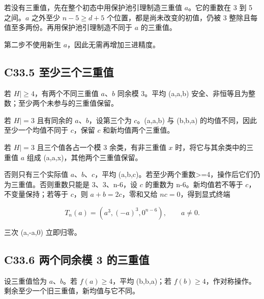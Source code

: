 {若没有三重值，先在整个初态中用保护池引理制造三重值} {\ensuremath{a}。它的重数在} {3} {到} {5} {之间。\ensuremath{a}} {之外至少} {\ensuremath{n-5\ge d+5}} {个位置，都是尚未改变的初值，仍被} {3} {整除且每值至多两份。再用保护池引理制造不同于} {\ensuremath{a}} {的三重值。}

{第二步不使用新生} {\ensuremath{a}，因此无需再增加三进精度。}

\subsection*{\texorpdfstring{{C33.5} {至少三个三重值}}{C33.5 至少三个三重值}}\label{C33-h219}

{若} {\textbar{}\ensuremath{H|\ge 4}，有两个不同三重值} {\ensuremath{a}、\ensuremath{b}} {同余模} {3。平均} {(a,a,b)} {安全、非恒等且为整数；至少两个未参与的三重值保留。}

{若} {\textbar{}\ensuremath{H|=3}} {且有同余的} {\ensuremath{a}、\ensuremath{b}，设第三个为} {\ensuremath{c}。(a,a,b)} {与} {(b,b,a)} {的均值不同，因此至少一个均值不同于} {\ensuremath{c}，保留} {\ensuremath{c}} {和新均值两个三重值。}

{若} {\textbar{}\ensuremath{H|=3}} {且三个值各占一个模} {3} {余类，有非三重值} {\ensuremath{x}} {时，将它与其余类中的三重值} {\ensuremath{a}} {组成} {(a,a,x)，其他两个三重值保留。}

{否则只有三个实际值} {\ensuremath{a}、\ensuremath{b}、\ensuremath{c}，平均} {(a,b,c)。若至少两个重数\textgreater=4，操作后它们仍为三重值。否则重数只能是} {3、3、n-6，设} {\ensuremath{c}} {的重数为} {n-6。新均值若不等于} {\ensuremath{c}，不变量保持；若等于} {\ensuremath{c}，则} {\ensuremath{a+b=2c}，零和又给} {\ensuremath{nc=0}，得到显式终端}

\[
T_n(a)=(a^3,(-a)^3,0^{n-6}),\qquad a\ne0.
\tag{C33.2}
\]

{三次} {(a,-a,0)} {立即归零。}

\subsection*{\texorpdfstring{{C33.6} {两个同余模} {3} {的三重值}}{C33.6 两个同余模 3 的三重值}}\label{C33-h220}

{设三重值恰为} {\ensuremath{a}、\ensuremath{b}。若} {\ensuremath{f(a)\ge 4}，平均} {(b,b,a)；若} {\ensuremath{f(b)\ge 4}，作对称操作。剩余至少一个旧三重值，新均值与它不同。}

